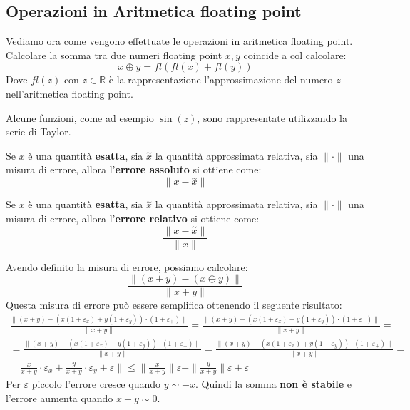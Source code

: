 \subsection{Operazioni in Aritmetica floating point}
Vediamo ora come vengono effettuate le operazioni in aritmetica floating point.
Calcolare la somma tra due numeri floating point $x,y$ coincide a col calcolare:
\begin{equation}
    x \oplus y = fl(fl(x) + fl(y))
\end{equation}
Dove $fl(z)$ con $z\in \mathbb{R}$ è la rappresentazione l'approssimazione del
numero $z$ nell'aritmetica floating point.
\begin{nota}
    Alcune funzioni, come ad esempio $\sin(z)$, sono rappresentate utilizzando
    la serie di Taylor.
\end{nota}
\begin{definizione} 
    Se $x$ è una quantità \textbf{esatta}, sia $\stackrel{\sim}{x}$ la quantità
    approssimata relativa, sia $\|\cdot\|$ una misura di errore, allora
    l'\textbf{errore assoluto} si ottiene come:
    \begin{equation}
        \|x-\stackrel{\sim}{x}\|
    \end{equation}
\end{definizione}
\begin{definizione} 
    Se $x$ è una quantità \textbf{esatta}, sia $\stackrel{\sim}{x}$ la quantità
    approssimata relativa, sia $\|\cdot\|$ una misura di errore, allora
    l'\textbf{errore relativo} si ottiene come:
    \begin{equation}
        \frac{\|x-\stackrel{\sim}{x}\|}{\|x\|}
    \end{equation}
\end{definizione}
Avendo definito la misura di errore, possiamo calcolare:
\begin{equation}
    \frac{\|(x+y)-(x\oplus y)\|}{\|x+y\|}
\end{equation}
Questa misura di errore può essere semplifica ottenendo il seguente risultato:
\begin{equation}
    \begin{aligned}
        \frac{\|(x + y) - (x (1 + \varepsilon_x) + y(1 + \varepsilon_y)) \cdot
            (1 + \varepsilon_+)\|}{\|x + y\|} = \frac{\|(x + y) - (x(1 + \varepsilon_x)
        + y(1+\varepsilon_y))\cdot (1 + \varepsilon_+)\|}{\|x + y\|} =    \\
        = \frac{\|(x + y) - (x(1 + \varepsilon_x) + y(1 + \varepsilon_y)) \cdot
            (1 + \varepsilon_+)\|}{\|x + y\|} = \frac{\|(x + y)-(x(1 + \varepsilon_x)
        + y(1 + \varepsilon_y)) \cdot (1 + \varepsilon_+)\|}{\|x + y\|} = \\
        \|\frac{x}{x + y} \cdot \varepsilon_x + \frac{y}{x + y} \cdot
        \varepsilon_y + \varepsilon\| \leq \|\frac{x}{x + y}\| \varepsilon +
        \|\frac{y}{x + y}\|\varepsilon + \varepsilon
    \end{aligned}
\end{equation}
Per $\varepsilon$ piccolo l'errore cresce quando $y \sim -x$. Quindi la somma
\textbf{non è stabile} e l'errore aumenta quando $x + y \sim 0$.

